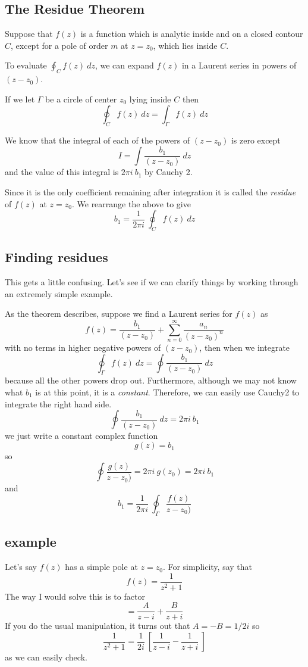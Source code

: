 \documentclass[11pt, oneside]{article}   	%
\begin{document}
\subsection*{The Residue Theorem}
Suppose that $f(z)$ is a function which is analytic inside and on a closed contour $C$, except for a pole of order $m$ at $z=z_0$, which lies inside $C$.

To evaluate $\oint_C f(z) \ dz$, we can expand $f(z)$ in a Laurent series in powers of $(z-z_0)$.  

If we let $\Gamma$ be a circle of center $z_0$ lying inside $C$ then
\[ \oint_C f(z) \ dz = \int_{\Gamma} f(z) \ dz \]

We know that the integral of each of the powers of $(z-z_0)$ is zero except
\[ I = \int \frac{b_1}{(z-z_0)} \ dz \]
and the value of this integral is $2 \pi i \ b_1$ by Cauchy 2.

Since it is the only coefficient remaining after integration it is called the \emph{residue} of $f(z)$ at $z = z_0$.  We rearrange the above to give
\[ b_1 = \frac{1}{2 \pi i} \ \oint_C f(z) \ dz \]

\subsection*{Finding residues}
This gets a little confusing.  Let's see if we can clarify things by working through an extremely simple example.  

As the theorem describes, suppose we find a Laurent series for $f(z)$ as
\[ f(z) = \frac{b_1}{(z-z_0)} + \sum_{n=0}^{\infty} \frac{a_n}{(z-z_0)^n} \]
with no terms in higher negative powers of $(z-z_0)$, then when we integrate
\[ \oint_{\Gamma}  f(z) \ dz = \oint \frac{b_1}{(z-z_0)} \ dz \]
because all the other powers drop out.
Furthermore, although we may not know what $b_1$ is at this point, it is a \emph{constant}.  Therefore, we can easily use Cauchy2 to integrate the right hand side.
 \[ \oint \frac{b_1}{(z-z_0)} \ dz = 2 \pi i \ b_1 \]
 we just write a constant complex function
 \[ g(z) = b_1 \]
 so 
 \[ \oint \frac{g(z)}{z-z_0)} = 2 \pi i \ g(z_0) = 2 \pi i \ b_1 \]
and
\[ b_1 = \frac{1}{2 \pi i} \ \oint_{\Gamma} \frac{f(z)}{z-z_0)} \]

\subsection*{example}
Let's say $f(z)$ has a simple pole at $z = z_0$.  For simplicity, say that 
\[ f(z) = \frac{1}{z^2 + 1} \]
The way I would solve this is to factor
\[ = \frac{A}{z - i} + \frac{B}{z + i} \]
If you do the usual manipulation, it turns out that $A = -B = 1/2i$ so
\[ \frac{1}{z^2 + 1}  = \frac{1}{2i} \ [ \frac{1}{z - i} - \frac{1}{z + i} \ ] \]
as we can easily check.
\end{document}
